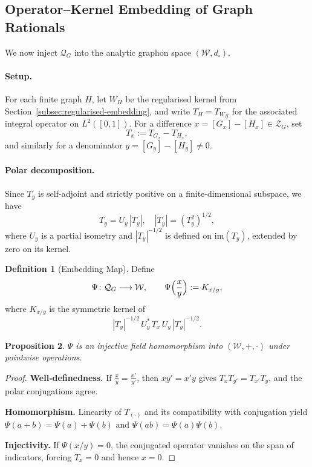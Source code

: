\documentclass[11pt]{article}
\theoremstyle{definition}
\newtheorem{definition}{Definition}[section]
\theoremstyle{plain}
\newtheorem{proposition}[definition]{Proposition}
\theoremstyle{remark}
\begin{document}
\subsection{Operator–Kernel Embedding of Graph Rationals}
\label{subsec:graph-rational-embedding}

We now inject \(\mathcal{Q}_G\) into the analytic graphon space
\((\mathcal{W},d_{\square})\).

\paragraph{Setup.}
For each finite graph \(H\), let \(W_H\) be the regularised kernel from
Section~\ref{subsec:regularised-embedding}, and write \(T_H=T_{W_H}\)
for the associated integral operator on \(L^2([0,1])\).  For a difference
\(x=[G_x]-[H_x]\in\mathcal{Z}_G\), set
\[
  T_x:=T_{G_x}-T_{H_x},
\]
and similarly for a denominator \(y=[G_y]-[H_y]\neq0\).

\paragraph{Polar decomposition.}
Since \(T_y\) is self‑adjoint and strictly positive on a finite‑dimensional
subspace, we have
\[
  T_y=U_y\,|T_y|,
  \quad
  |T_y|=(T_y^2)^{1/2},
\]
where \(U_y\) is a partial isometry and \(|T_y|^{-1/2}\) is defined on
\(\mathrm{im}(T_y)\), extended by zero on its kernel.

\begin{definition}[Embedding Map]
Define
\[
  \Psi\colon\mathcal{Q}_G\longrightarrow\mathcal{W},
  \qquad
  \Psi\Bigl(\frac{x}{y}\Bigr)
  :=K_{x/y},
\]
where \(K_{x/y}\) is the symmetric kernel of
\[
  |T_y|^{-1/2}\,U_y^*\,T_x\,U_y\,|T_y|^{-1/2}.
\]
\end{definition}

\begin{proposition}
\(\Psi\) is an injective field homomorphism into
\((\mathcal{W},+,\cdot)\) under pointwise operations.
\end{proposition}

\begin{proof}
\textbf{Well‑definedness.}  If \(\tfrac{x}{y}=\tfrac{x'}{y'}\), then
\(xy'=x'y\) gives \(T_xT_{y'}=T_{x'}T_y\), and the polar conjugations
agree.

\textbf{Homomorphism.}  Linearity of \(T_{(\cdot)}\) and its compatibility
with conjugation yield
\(\Psi(a+b)=\Psi(a)+\Psi(b)\) and
\(\Psi(ab)=\Psi(a)\Psi(b)\).

\textbf{Injectivity.}  If \(\Psi(x/y)=0\), the conjugated operator
vanishes on the span of indicators, forcing \(T_x=0\) and hence \(x=0\).
\end{proof}
\end{document}
